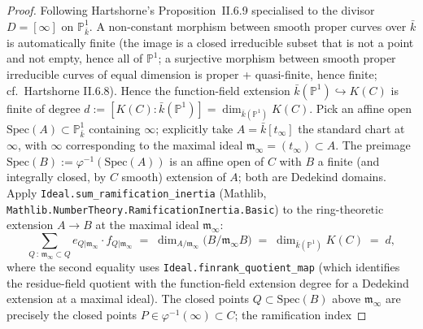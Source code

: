 \begin{proof}
  Following Hartshorne's Proposition~II.6.9 specialised to the divisor
  \(D = [\infty]\) on \(\mathbb P^1_{\bar k}\). A non-constant morphism
  between smooth proper curves over \(\bar k\) is automatically finite (the
  image is a closed irreducible subset that is not a point and not empty,
  hence all of \(\mathbb P^1\); a surjective morphism between smooth proper
  irreducible curves of equal dimension is proper + quasi-finite, hence
  finite; cf.\ Hartshorne II.6.8). Hence the function-field extension
  \(\bar k(\mathbb P^1) \hookrightarrow K(C)\) is finite of degree
  \(d := [K(C) : \bar k(\mathbb P^1)] = \dim_{\bar k(\mathbb P^1)} K(C)\).
  Pick an affine open \(\mathrm{Spec}(A) \subset \mathbb P^1_{\bar k}\) containing
  \(\infty\); explicitly take \(A = \bar k[t_\infty]\) the standard chart at
  \(\infty\), with \(\infty\) corresponding to the maximal ideal
  \(\mathfrak m_\infty = (t_\infty) \subset A\). The preimage
  \(\mathrm{Spec}(B) := \varphi^{-1}(\mathrm{Spec}(A))\) is an affine open of \(C\)
  with \(B\) a finite (and integrally closed, by \(C\) smooth) extension of
  \(A\); both are Dedekind domains. Apply
  \texttt{Ideal.sum\_ramification\_inertia} (Mathlib,
  \texttt{Mathlib.NumberTheory.RamificationInertia.Basic}) to the
  ring-theoretic extension \(A \to B\) at the maximal ideal
  \(\mathfrak m_\infty\):
  \[
    \sum_{Q \,\colon\, \mathfrak m_\infty \subset Q} e_{Q | \mathfrak m_\infty} \cdot f_{Q | \mathfrak m_\infty}
    \;=\; \dim_{A / \mathfrak m_\infty}\!\bigl(B / \mathfrak m_\infty B\bigr)
    \;=\; \dim_{\bar k(\mathbb P^1)} K(C) \;=\; d,
  \]
  where the second equality uses
  \texttt{Ideal.finrank\_quotient\_map} (which identifies the residue-field
  quotient with the function-field extension degree for a Dedekind extension
  at a maximal ideal). The closed points \(Q \subset \mathrm{Spec}(B)\) above
  \(\mathfrak m_\infty\) are precisely the closed points
  \(P \in \varphi^{-1}(\infty) \subset C\); the ramification index

\end{proof}
